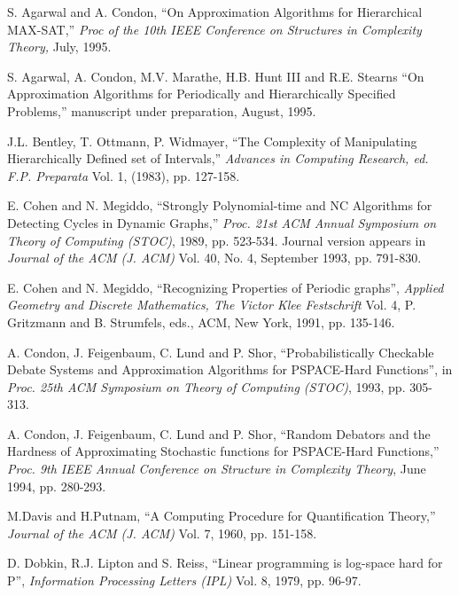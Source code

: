 \begin{thebibliography}{HMRR93}
 S. Agarwal and  A. Condon, 
``On Approximation Algorithms for Hierarchical MAX-SAT,''
{\em Proc of the 10th IEEE Conference on Structures in Complexity Theory,} 
July, 1995.


 S. Agarwal, A. Condon, 
M.V. Marathe, H.B. Hunt III and R.E. Stearns 
``On Approximation Algorithms for Periodically and Hierarchically Specified
Problems,'' manuscript under preparation,
August, 1995.


 J.L. Bentley, T. Ottmann, P. Widmayer,
``The Complexity of Manipulating Hierarchically Defined set of Intervals,''
{\em Advances in Computing Research, ed.  F.P. Preparata} 
Vol. 1, (1983), pp. 127-158.





E. Cohen and  N. Megiddo,
``Strongly Polynomial-time and NC Algorithms for 
Detecting Cycles in Dynamic Graphs,''
{\em Proc. 21st ACM Annual Symposium on Theory of Computing (STOC)}, 
1989, pp. 523-534. 
Journal version  appears in {\em Journal of the ACM (J. ACM)} Vol. 40,
No. 4, September 1993, pp. 791-830.




E. Cohen and N. Megiddo,
``Recognizing Properties of Periodic graphs'',
{\em Applied Geometry and Discrete Mathematics, The Victor Klee Festschrift}
Vol. 4, P. Gritzmann and B. Strumfels, eds., ACM, New York, 1991, pp. 135-146.




 A. Condon, J. Feigenbaum, C. Lund and P. Shor,
``Probabilistically Checkable Debate Systems and Approximation Algorithms
for PSPACE-Hard Functions'', in  
{\em Proc.  25th ACM Symposium on Theory of Computing (STOC)}, 
1993, pp. 305-313.


 A. Condon, J. Feigenbaum, C. Lund and P. Shor,
``Random Debators and the Hardness of Approximating
Stochastic functions for PSPACE-Hard Functions,'' 
{\em Proc. 9th IEEE Annual Conference on Structure in Complexity Theory}, 
June 1994, pp. 280-293. 


M.Davis and H.Putnam, 
``A Computing Procedure for Quantification Theory,''
{\em Journal of the ACM (J. ACM)} 
Vol. 7, 1960, pp. 151-158.




D. Dobkin, R.J. Lipton and S. Reiss,
``Linear programming is log-space hard for P'',
{\em Information Processing Letters (IPL)} 
Vol. 8, 1979, pp. 96-97.



\end{thebibliography}
